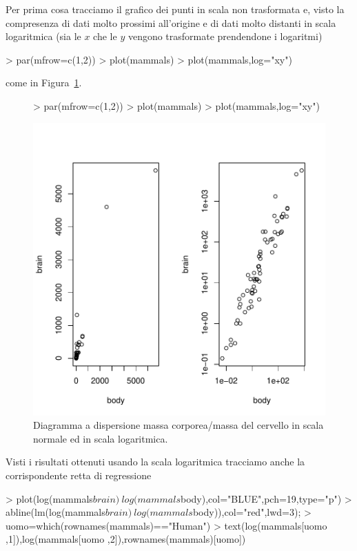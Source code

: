 \documentclass[onecolumn,11pt]{book}
\begin{document}
Per prima cosa tracciamo il grafico dei punti  in scala non trasformata e, visto la compresenza di dati molto prossimi all'origine e di dati molto distanti in scala logaritmica (sia le $x$ che le $y$ vengono trasformate prendendone i logaritmi)
\begin{Schunk}
\begin{Sinput}
> par(mfrow=c(1,2))
> plot(mammals)
> plot(mammals,log="xy")
\end{Sinput}
\end{Schunk}
come in Figura~\ref{fig:duemammals}.\begin{figure}[htbp]
\begin{center}
\begin{Schunk}
\begin{Sinput}
> par(mfrow=c(1,2))
> plot(mammals)
> plot(mammals,log="xy")
\end{Sinput}
\end{Schunk}
\includegraphics{statisticaconR-178}
\caption{Diagramma a dispersione massa corporea/massa del cervello in scala normale ed in scala logaritmica. }
\label{fig:duemammals}
\end{center}
\end{figure}
Visti i  risultati ottenuti usando la scala logaritmica tracciamo anche la corrispondente retta di regressione 
\begin{Schunk}
\begin{Sinput}
> plot(log(mammals$brain)~log(mammals$body),col="BLUE",pch=19,type="p")
> abline(lm(log(mammals$brain)~ log(mammals$body)),col="red",lwd=3); 
> uomo=which(rownames(mammals)=="Human")
> text(log(mammals[uomo ,1]),log(mammals[uomo ,2]),rownames(mammals)[uomo])
\end{Sinput}
\end{Schunk}
\end{document}
